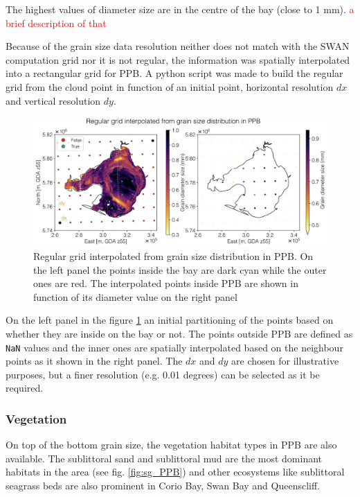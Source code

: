 \documentclass[12pt]{article}
\begin{document}
The highest values of diameter size are in the centre of the bay (close to 1 mm). \textcolor{red}{a brief description of that}

Because of the grain size data resolution neither does not match with the SWAN computation grid nor it is not regular, the information was spatially interpolated into a rectangular grid for PPB. A python script was made to build the regular grid from the cloud point in function of an initial point, horizontal resolution $dx$ and vertical resolution $dy$.

\begin{figure}[h]
    \centering
    \includegraphics[scale=0.45]{plots/maps/interpolated_D.png}
    \caption{Regular grid interpolated from grain size distribution in PPB. On the left panel the points inside the bay are dark cyan while the outer ones are red. The interpolated points inside PPB are shown in function of its diameter value on the right panel}
    \label{fig:interpolated_D}
\end{figure}

On the left panel in the figure \ref{fig:interpolated_D} an initial partitioning of the points based on whether they are inside on the bay or not. The points outside PPB are defined as \verb|NaN| values and the inner ones are spatially interpolated based on the neighbour points as it shown in the right panel. The $dx$ and $dy$ are chosen for illustrative purposes, but a finer resolution (e.g. 0.01 degrees) can be selected as it be required.

\subsubsection*{Vegetation}

On top of the bottom grain size, the vegetation habitat types in PPB are also available. The sublittoral sand and sublittoral mud are the most dominant habitats in the area (see fig. \ref{fig:sg_PPB}) and other ecosystems like sublittoral seagrass beds are also prominent in Corio Bay, Swan Bay and Queenscliff.
\end{document}
